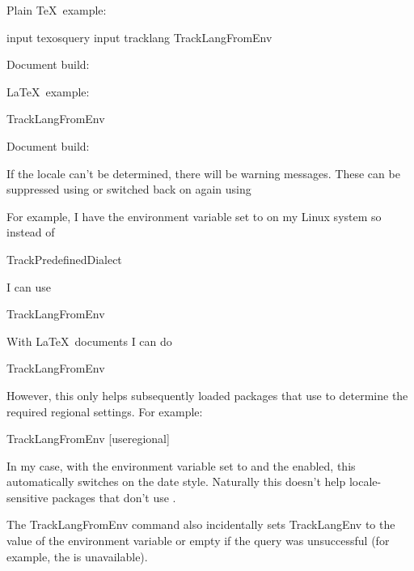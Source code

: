 \documentclass[titlepage=false,oneside,
 fontsize=12pt,captions=tableheading]{scrbook}
\begin{document}
Plain \TeX\ example:
\begin{codebox}
\gls{input} texosquery
\gls{input} tracklang
\gls{TrackLangFromEnv}
\end{codebox}
Document build:
\begin{terminal}
  
\end{terminal}

\LaTeX\ example:
\begin{codebox}
\gls{TrackLangFromEnv}
\end{codebox}
Document build:
\begin{terminal}
  
\end{terminal}

If the locale can't be determined, there will be warning messages.
These can be suppressed using
or switched back on again using

For example, I have the environment variable  set to 
 on my Linux system so instead of
\begin{codebox}
\gls{TrackPredefinedDialect}
\end{codebox}
I can use
\begin{codebox}
\gls{TrackLangFromEnv}
\end{codebox}

With \LaTeX\ documents I can do
\begin{codebox}
\gls{TrackLangFromEnv}
\end{codebox}
However, this only helps subsequently loaded packages that
use  to determine the required regional 
settings. For example:
\begin{codebox}
\gls{TrackLangFromEnv}
[useregional]
\end{codebox}
In my case, with the  environment variable set to
 and the
 enabled, this automatically switches on the 
 date style.
Naturally this doesn't help locale-sensitive packages that don't use
.

The \gls{TrackLangFromEnv} command also incidentally sets
\gls{TrackLangEnv}
to the value of the environment variable or empty if the
query was unsuccessful (for example, the  is
unavailable).
\end{document}
